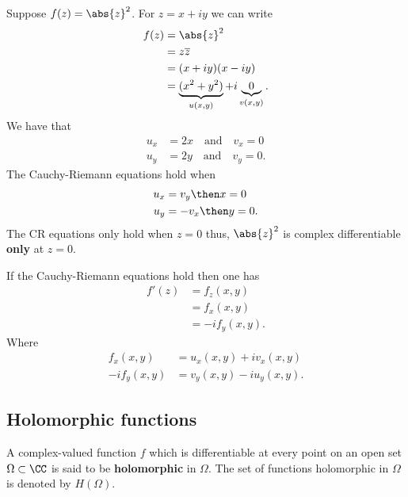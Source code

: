 \documentclass[12pt, a4paper]{article}
\begin{document}
\begin{mdexample}
    Suppose \(f(z)= \abs{z}^2\). For \(z=x+iy\) we can write 
    \[\begin{aligned}
        f(z) &= \abs{z}^2 \\
        &= z \overline{z} \\
        &= (x+iy)(x-iy) \\
        &= \underbrace{(x^2+y^2)}_{u(x,y)} +i \underbrace{0}_{v(x,y)}.
    \end{aligned}\]
    We have that 
    \[\begin{aligned}
        u_x &= 2x \quad \text{and} \quad v_x =0 \\
        u_y &= 2y \quad \text{and} \quad v_y =0.
    \end{aligned}\]
    The Cauchy-Riemann equations hold when 
    \[\begin{aligned}
        u_x &= v_y \then x=0 \\
        u_y &= -v_x \then y=0.
    \end{aligned}\]
    The CR equations only hold when \(z = 0\) thus, \(\abs{z}^2\) is complex differentiable \textbf{only} at \(z=0\).
\end{mdexample}

\begin{mdcor}
    If the Cauchy-Riemann equations hold then one has 
    \[\begin{aligned}
        f'(z) &= f_z(x,y) \\
        &= f_x(x,y) \\
        &= -if_y(x,y).
    \end{aligned}\]
    Where 
    \[\begin{aligned}
        f_x(x,y) &= u_x(x,y)+i v_x(x,y) \\
        -if_y(x,y) &= v_y(x,y) -i u_y(x,y).
    \end{aligned}\]
\end{mdcor}

\subsection{Holomorphic functions}

\begin{definition}
    A complex-valued function \(f\) which is differentiable at every point on an open set \(\Omega \subset \CC\) is said to be \textbf{holomorphic} in \(\Omega\). The set of functions holomorphic in \(\Omega\) is denoted by \(H(\Omega)\).
\end{definition}
\end{document}
